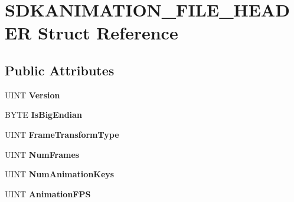 \hypertarget{struct_s_d_k_a_n_i_m_a_t_i_o_n___f_i_l_e___h_e_a_d_e_r}{\section{S\+D\+K\+A\+N\+I\+M\+A\+T\+I\+O\+N\+\_\+\+F\+I\+L\+E\+\_\+\+H\+E\+A\+D\+E\+R Struct Reference}
\label{struct_s_d_k_a_n_i_m_a_t_i_o_n___f_i_l_e___h_e_a_d_e_r}
}
\subsection*{Public Attributes}
\begin{DoxyCompactItemize}
\item 
\hypertarget{struct_s_d_k_a_n_i_m_a_t_i_o_n___f_i_l_e___h_e_a_d_e_r_aa500ddb707c035febce0ae13a8226f6b}{U\+I\+N\+T {\bfseries Version}}\label{struct_s_d_k_a_n_i_m_a_t_i_o_n___f_i_l_e___h_e_a_d_e_r_aa500ddb707c035febce0ae13a8226f6b}

\item 
\hypertarget{struct_s_d_k_a_n_i_m_a_t_i_o_n___f_i_l_e___h_e_a_d_e_r_af9103ff728a5dc77a788f926ca102f29}{B\+Y\+T\+E {\bfseries Is\+Big\+Endian}}\label{struct_s_d_k_a_n_i_m_a_t_i_o_n___f_i_l_e___h_e_a_d_e_r_af9103ff728a5dc77a788f926ca102f29}

\item 
\hypertarget{struct_s_d_k_a_n_i_m_a_t_i_o_n___f_i_l_e___h_e_a_d_e_r_a2134c79f12c57dd008b7a9e494a4ca98}{U\+I\+N\+T {\bfseries Frame\+Transform\+Type}}\label{struct_s_d_k_a_n_i_m_a_t_i_o_n___f_i_l_e___h_e_a_d_e_r_a2134c79f12c57dd008b7a9e494a4ca98}

\item 
\hypertarget{struct_s_d_k_a_n_i_m_a_t_i_o_n___f_i_l_e___h_e_a_d_e_r_a3de569ac05902dafa5f13496dde103bc}{U\+I\+N\+T {\bfseries Num\+Frames}}\label{struct_s_d_k_a_n_i_m_a_t_i_o_n___f_i_l_e___h_e_a_d_e_r_a3de569ac05902dafa5f13496dde103bc}

\item 
\hypertarget{struct_s_d_k_a_n_i_m_a_t_i_o_n___f_i_l_e___h_e_a_d_e_r_ad6aae18c82f4cc6a0dd0b8766b506769}{U\+I\+N\+T {\bfseries Num\+Animation\+Keys}}\label{struct_s_d_k_a_n_i_m_a_t_i_o_n___f_i_l_e___h_e_a_d_e_r_ad6aae18c82f4cc6a0dd0b8766b506769}

\item 
\hypertarget{struct_s_d_k_a_n_i_m_a_t_i_o_n___f_i_l_e___h_e_a_d_e_r_a4d7a12c22ed6513195cda6d4bb04aad9}{U\+I\+N\+T {\bfseries Animation\+F\+P\+S}}\label{struct_s_d_k_a_n_i_m_a_t_i_o_n___f_i_l_e___h_e_a_d_e_r_a4d7a12c22ed6513195cda6d4bb04aad9}


\end{DoxyCompactItemize}
